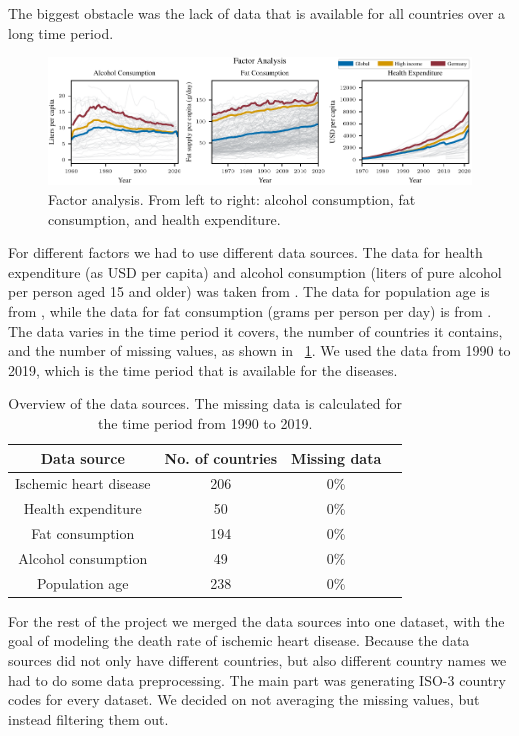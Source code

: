 The biggest obstacle was the lack of data that is available for all countries over a long time period. 


\begin{figure}[ht]
    \vskip 0.2in
    \centering
    \centerline{\includegraphics[]{fig/fig_factor_analysis.pdf}}
    \caption{Factor analysis. From left to right: alcohol consumption, fat consumption, and health expenditure. }
    \label{Factor analysis}
\end{figure}
For different factors we had to use different data sources.
The data for health expenditure (as USD per capita) and alcohol consumption (liters of pure alcohol per person aged 15 and older) was taken from \citet{oecd}. 
The data for population age is from \citet{age}, while the data for fat consumption (grams per person per day) is from \citet{fat_consumption}. The data varies in the time period it covers,
the number of countries it contains, and the number of missing values, as shown in \tablename~\ref{Data overview}. We used the data from 1990 to 2019, which is the time period
that is available for the diseases.

\begin{table}[h]
    \centering
    \caption{Overview of the data sources. The missing data is calculated for the time period from 1990 to 2019.}
    \label{Data overview}
    \begin{tabular}{|c|c|c|c|}
    \hline
    Data source & No. of countries & Missing data\\
    \hline
    Ischemic heart disease & 206 & 0\%\\
    Health expenditure & 50 & 0\%\\
    Fat consumption & 194 & 0\%\\
    Alcohol consumption & 49 & 0\%\\
    Population age & 238 & 0\%\\
    \hline
    \end{tabular}
\end{table}



For the rest of the project we merged the data sources into one dataset, with the goal of modeling the death rate of ischemic heart disease. Because the data sources did not only have different countries, but also different country names we had to do some data preprocessing. The main part was generating ISO-3 country codes for every dataset. 
We decided on not averaging the missing values, but instead filtering them out.

